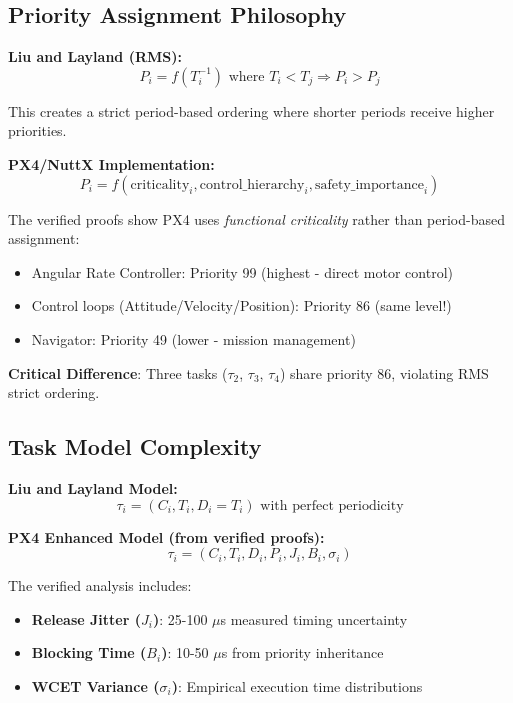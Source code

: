 \documentclass[12pt,a4paper]{article}
\begin{document}
\subsection{Priority Assignment Philosophy}

\textbf{Liu and Layland (RMS):}
\begin{equation}
P_i = f(T_i^{-1}) \text{ where } T_i < T_j \Rightarrow P_i > P_j
\end{equation}

This creates a strict period-based ordering where shorter periods receive higher priorities.

\textbf{PX4/NuttX Implementation:}
\begin{equation}
P_i = f(\text{criticality}_i, \text{control\_hierarchy}_i, \text{safety\_importance}_i)
\end{equation}

The verified proofs show PX4 uses \textit{functional criticality} rather than period-based assignment:
\begin{itemize}
\item Angular Rate Controller: Priority 99 (highest - direct motor control)
\item Control loops (Attitude/Velocity/Position): Priority 86 (same level!)
\item Navigator: Priority 49 (lower - mission management)
\end{itemize}

\textbf{Critical Difference}: Three tasks ($\tau_2$, $\tau_3$, $\tau_4$) share priority 86, violating RMS strict ordering.

\subsection{Task Model Complexity}

\textbf{Liu and Layland Model:}
\begin{equation}
\tau_i = (C_i, T_i, D_i = T_i) \text{ with perfect periodicity}
\end{equation}

\textbf{PX4 Enhanced Model (from verified proofs):}
\begin{equation}
\tau_i = (C_i, T_i, D_i, P_i, J_i, B_i, \sigma_i)
\end{equation}

The verified analysis includes:
\begin{itemize}
\item \textbf{Release Jitter ($J_i$)}: 25-100 $\mu$s measured timing uncertainty
\item \textbf{Blocking Time ($B_i$)}: 10-50 $\mu$s from priority inheritance
\item \textbf{WCET Variance ($\sigma_i$)}: Empirical execution time distributions
\end{itemize}
\end{document}
